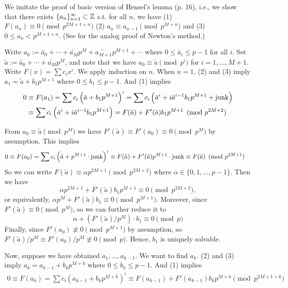 \documentclass[../Koblitz.tex]{subfiles}
\begin{document}
We imitate the proof of basic version of Hensel's lemma (p. 16), i.e., we show that there exists $\{a_n\}_{n=1}^\infty\subset\mathbb{Z}$ s.t. for all $n$, we have (1) $F(a_n)\equiv0 \pmod{p^{2M+1+n}}$ (2) $a_n\equiv a_{n-1} \pmod{p^{M+n}}$ and (3) $0\leq a_n < p^{M+1+n}$. (See  for the analog proof of Newton's method.)

Write $a_0 := \tilde{a_0}+\cdots+\tilde{a_M}p^M + \tilde{a_{M+1}}p^{M+1}+\cdots$ where $0\leq\tilde{a_i}\leq p-1$ for all $i$. Set $\tilde{a}:=\tilde{a_0}+\cdots+\tilde{a_M}p^M$, and note that we have $a_0\equiv\tilde{a} \pmod{p^i}$ for $i=1,\ldots,M+1$. Write $F(x)=\sum c_ix^i$. We apply induction on $n$. When $n=1$, (2) and (3) imply $a_1=\tilde{a}+b_1p^{M+1}$ where $0\leq b_1 \leq p-1$. And (1) implies
\begin{align*}
0 &\equiv F(a_1) = \sum c_i\left(\tilde{a}+b_1p^{M+1}\right)^i = \sum c_i\left(\tilde{a}^i+i\tilde{a}^{i-1}b_1p^{M+1}+\operatorname{junk}\right) \\
&\equiv \sum c_i\left(\tilde{a}^i+i\tilde{a}^{i-1}b_1p^{M+1}\right) = F(\tilde{a}) + F'(\tilde{a})b_1p^{M+1} \pmod{p^{2M+2}}
\end{align*}

From $a_0 \equiv \tilde{a} \pmod{p^M}$ we have $F'(\tilde{a})\equiv F'(a_0) \equiv 0 \pmod{p^M}$ by assumption. This implies
\begin{align*}
0\equiv F(a_0) &= \sum c_i\left(\tilde{a} + p^{M+1}\cdot\operatorname{junk}\right)^i \equiv F(\tilde{a}) + F'(\tilde{a})p^{M+1}\cdot\operatorname{junk} \equiv F(\tilde{a}) \pmod{p^{2M+1}}
\end{align*}
So we can write $F(\tilde{a})\equiv \alpha p^{2M+1} \pmod{p^{2M+2}}$ where $\alpha\in\{0,1,\ldots,p-1\}$. Then we have $$\alpha p^{2M+1} + F'(\tilde{a})b_1p^{M+1} \equiv 0 \pmod{p^{2M+2}},$$ or equivalently, $\alpha p^M+F'(\tilde{a})b_1\equiv 0\pmod{p^{M+1}}$. Moreover, since $F'(\tilde{a})\equiv 0 \pmod{p^M}$, so we can further reduce it to $$\alpha+(F'(\tilde{a})/p^M)\cdot b_1 \equiv 0\pmod{p}$$ Finally, since $F'(a_0)\not\equiv 0 \pmod{p^{M+1}}$ by assumption, so $F'(\tilde{a})/p^M \equiv F'(a_0)/p^M\not\equiv 0 \pmod{p}$. Hence, $b_1$ is uniquely solvable.

Now, suppose we have obtained $a_1,\ldots,a_{k-1}$. We want to find $a_k$. (2) and (3) imply $a_k=a_{k-1}+b_kp^{M+k}$ where $0\leq b_k\leq p-1$. And (1) implies
\begin{align*}
0\equiv F(a_k) = \sum c_i\left(a_{k-1}+b_kp^{M+k}\right)^i \equiv F(a_{k-1})+F'(a_{k-1})b_kp^{M+k} \pmod{p^{2M+1+k}}
\end{align*}
\end{document}
